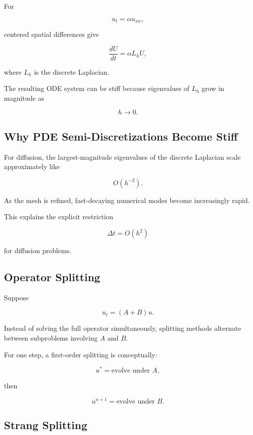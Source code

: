 For

\[
u_t
=
\alpha u_{xx},
\]

centered spatial differences give

\[
\boxed{
\frac{dU}{dt}
=
\alpha L_hU,
}
\]

where \(L_h\) is the discrete Laplacian.

The resulting ODE system can be stiff because eigenvalues of \(L_h\) grow
in magnitude as

\[
h\to0.
\]

\subsection{Why PDE Semi-Discretizations Become Stiff}
\label{subsec:pde-semidiscrete-stiffness}

For diffusion, the largest-magnitude eigenvalues of the discrete Laplacian
scale approximately like

\[
\boxed{
O(h^{-2}).
}
\]

As the mesh is refined, fast-decaying numerical modes become increasingly
rapid.

This explains the explicit restriction

\[
\boxed{
\Delta t=O(h^2)
}
\]

for diffusion problems.

\subsection{Operator Splitting}
\label{subsec:operator-splitting}

Suppose

\[
\boxed{
u_t
=
(A+B)u.
}
\]

Instead of solving the full operator simultaneously, splitting methods
alternate between subproblems involving \(A\) and \(B\).

For one step, a first-order splitting is conceptually:

\[
\boxed{
u^*
=
\text{evolve under }A,
}
\]

then

\[
\boxed{
u^{n+1}
=
\text{evolve under }B.
}
\]

\subsection{Strang Splitting}
\label{subsec:strang-splitting}

